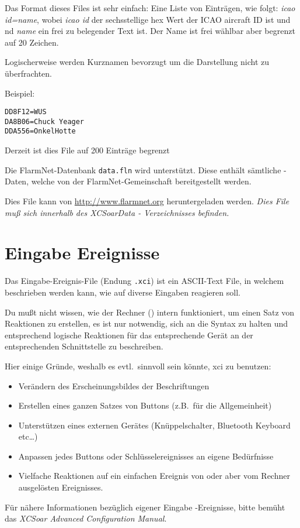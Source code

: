 Das Format dieses Files ist sehr einfach: Eine Liste von Einträgen, wie folgt:
{\em icao id=name}, wobei {\em icao id} der sechsstellige hex Wert der ICAO
aircraft ID ist und  nd {\em name} ein frei zu belegender Text ist.
Der Name ist frei wählbar aber  begrenzt auf 20 Zeichen.

Logischerweise werden Kurznamen bevorzugt um die Darstellung nicht zu überfrachten.

Beispiel:
\begin{verbatim}
DD8F12=WUS
DA8B06=Chuck Yeager
DDA556=OnkelHotte
\end{verbatim}

Derzeit ist dies File auf 200 Einträge begrenzt

Die  FlarmNet-Datenbank \verb|data.fln| wird unterstützt.
Diese enthält sämtliche \fl-Daten, welche von der \textsf{\textsf{FlarmNet}}-Gemeinschaft bereitgestellt werden.

Dies File kann von  \url{http://www.flarmnet.org}  heruntergeladen werden.
\textsl{Dies File muß sich innerhalb des XCSoarData - Verzeichnisses befinden.}

\section{Eingabe Ereignisse}

Das Eingabe-Ereignis-File  (Endung \verb|.xci|) ist ein ASCII-Text File,
in welchem beschrieben werden kann, wie  \xc auf diverse Eingaben reagieren soll.

Du mußt nicht wissen, wie der Rechner (\xc) intern funktioniert, um einen Satz von
Reaktionen zu erstellen, es ist nur notwendig, sich an die Syntax zu halten und entsprechend logische
Reaktionen für das entsprechende Gerät an der entsprechenden Schnittstelle zu beschreiben.

Hier einige Gründe, weshalb es evtl.\ sinnvoll sein könnte, \textsf{xci} zu benutzen:
\begin{itemize}
\item Verändern des Erscheinungsbildes der   Beschriftungen
\item Erstellen eines ganzen Satzes von Buttons (z.B.\ für die Allgemeinheit)
\item Unterstützen eines externen Gerätes (Knüppelschalter, Bluetooth Keyboard etc\dots)
\item Anpassen jedes Buttons oder Schlüsselereignisses an eigene Bedürfnisse
\item Vielfache Reaktionen auf ein einfachen Ereignis von  \xc oder aber vom Rechner
ausgelösten Ereignisses.
\end{itemize}
Für nähere Informationen bezüglich eigener Eingabe -Ereignisse, bitte bemüht das {\em XCSoar Advanced Configuration Manual}.
